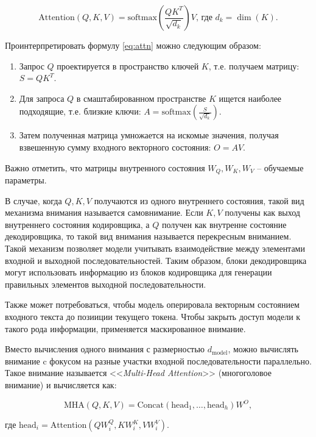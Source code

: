 \begin{equation}
    \text{Attention}\left(Q,K,V\right) = \text{softmax}\left(\frac{QK^T}{\sqrt{d_k}}\right)V\text{, где }d_k = \dim(K).
    \label{eq:attn}
\end{equation}

Проинтерпретировать формулу \ref{eq:attn} можно следующим образом:

\begin{enumerate}
    \item Запрос $Q$ проектируется в пространство ключей $K$, т.е. получаем матрицу: $S = QK^T$.
    \item Для запроса $Q$ в смаштабированном пространстве $K$ ищется наиболее подходящие, т.е. близкие ключи: $A=\text{softmax}\left(\frac{S}{\sqrt{d_k}}\right)$.
    \item Затем полученная матрица умножается на искомые значения, получая взвешенную сумму входного векторного состояния: $O=AV$.
\end{enumerate}

Важно отметить, что матрицы внутренного состояния $W_Q,W_K,W_V$ -- обучаемые параметры.

В случае, когда $Q, K, V$ получаются из одного внутреннего состояния, такой вид механизма внимания называется самовнимание. Если $K, V$ получены как выход внутреннего состояния кодировщика, а $Q$ получен как внутренне состояние декодировщика, то такой вид внимания называется перекресным вниманием. Такой механизм позволяет модели учитывать взаимодействие между элементами входной и выходной последовательностей. Таким образом, блоки декодировщика могут использовать информацию из блоков кодировщика для генерации правильных элементов выходной последовательности.

Также может потребоваться, чтобы модель оперировала векторным состоянием входного текста до позииции текущего токена. Чтобы закрыть доступ модели к такого рода информации, применяется маскированное внимание.

Вместо вычисления одного внимания с размерностью $d_{\text{model}}$, можно вычислять внимание c фокусом на разные участки входной последовательности параллельно. Такое внимание называется <<\textit{Multi-Head Attention}>> (многоголовое внимание) и вычисляется как:

\begin{equation}
    \text{MHA}(Q, K, V) = \text{Concat}(\text{head}_1, \dots, \text{head}_h) W^O,
\end{equation}

где $\text{head}_i = \text{Attention}(QW_i^Q, KW_i^K, VW_i^V)$.

